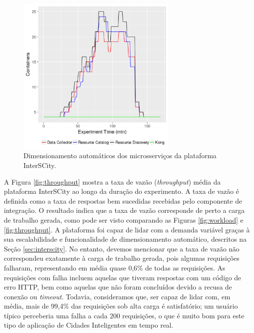 \begin{figure}[ht]
	\centering
	\includegraphics[width=0.7\textwidth]{figuras/auto-scaling.png}
    \caption{Dimensionamento automáticos dos microsserviços da plataforma InterSCity.}
	\label{fig:auto-scaling}
\end{figure}


A Figura \ref{fig:throughput} mostra a taxa de vazão (\textit{throughput}) média da plataforma InterSCity ao longo da duração do experimento.
A taxa de vazão é definida como a taxa de respostas bem sucedidas recebidas pelo componente de integração.
O resultado indica que a taxa de vazão corresponde de perto a carga de trabalho gerada, como pode ser visto comparando as Figuras \ref{fig:workload} e \ref{fig:throughput}.
A plataforma foi capaz de lidar com a demanda variável graças à sua escalabilidade e funcionalidade de dimensionamento automático, descritos na Seção \ref{sec:interscity}.
No entanto, devemos mencionar que a taxa de vazão não correspondeu exatamente à carga de trabalho gerada, pois algumas requisições falharam, representando em média quase 0,6\% de todas as requisições.
As requisições com falha incluem aquelas que tiveram respostas com um código de erro HTTP, bem como aquelas que não foram concluídos devido a recusa de conexão ou \textit{timeout}.
Todavia, consideramos que, ser capaz de lidar com, em média, mais de 99,4\% das requisições sob alta carga é satisfatório; um usuário típico perceberia uma falha a cada 200 requisições, o que é muito bom para
este tipo de aplicação de Cidades Inteligentes em tempo real.

